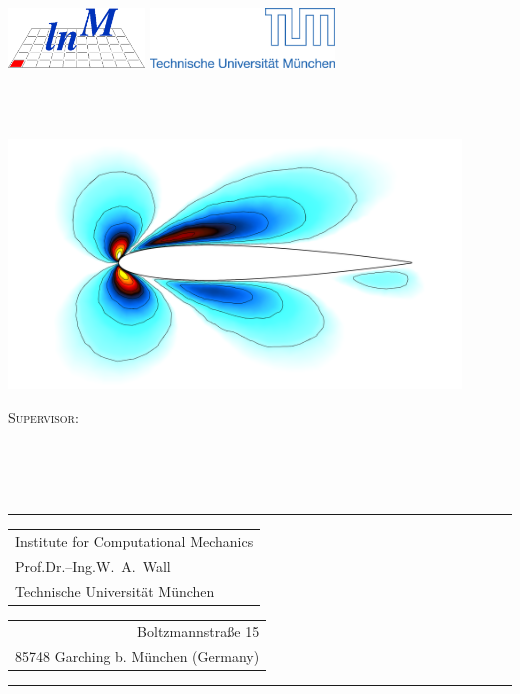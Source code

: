 \begin{titlepage}
\thispagestyle{empty}
\vspace{-1.5cm}
\includegraphics[height=1.5772cm]{./fig/lnm.eps}
\hfill
\includegraphics[height=1.5772cm]{./fig/tum.eps}
\vfill

\begin{center}
\Huge{\thesistitle}
\\
\vspace{0.2cm}
\LARGE{\Author}
\\
\vspace{0.2cm}
\large{\thesistype}
\end{center}
\vspace{0.1cm}
%
\begin{center}
\includegraphics[width=12cm]{fig/titlepage_figure2}
\end{center}
%
\vfill
%
\begin{minipage}[c]{1.0\textwidth}
\centering
{\large \scshape Supervisor:}\\
{\Supervisor}\\ %
\texttt{\Mail}\\
\end{minipage}
%
\vspace{1cm}\\
%
\rule{\textwidth}{1pt}
%
\begin{tabular}[t]{l}
Institute for Computational Mechanics
\\
  Prof.\@ Dr.--Ing.\@ W.\ A.\ Wall
\\
Technische Universit\"at M\"unchen
\end{tabular}
\hfill
\begin{tabular}[t]{r}
\\
Boltzmannstra\ss e 15
\\
85748 Garching b. M\"unchen (Germany)\\
\end{tabular}
\rule{\textwidth}{1pt}


\end{titlepage}